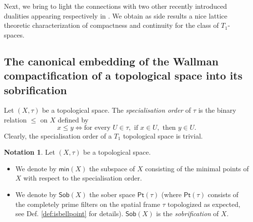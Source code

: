 \documentclass{article}
\theoremstyle{plain}
\theoremstyle{definition}
\newtheorem{notation}[theorem]{Notation}
\theoremstyle{remark}
\newcommand{\bool}[1]{\mathsf{#1}}
\newcommand{\0}{\mathbbm 0}
\newcommand{\1}{\mathbbm 1}
\newcommand{\2}{\mathbbm 2}
\begin{document}
Next, we bring to light the connections with two other recently introduced dualities appearing respectively in \cite{bice2020wallmandualitysemilatticesubbases,maruyama}. We obtain as side results a nice lattice theoretic characterization of compactness and continuity for the class of $T_1$-spaces.


\subsection{The canonical embedding of the Wallman compactification of a topological space into its sobrification} \label{subsec:cornishvsisbell}
Let $(X, \tau)$ be a topological space. The \emph{specialisation order} of $\tau$ is the binary relation $\leq$ on $X$ defined by
\[
    x \leq y \iff \text{for every } U \in \tau, \text{ if } x \in U, \text{ then } y \in U.
\]
Clearly, the specialisation order of a \(T_1\) topological space is trivial. 

\begin{notation}
Let  \((X,\tau)\) be a topological space. 
\begin{itemize}
    \item \label{not:min} We denote by \(\bool{min}(X)\) the subspace of \(X\) consisting of the minimal points of $X$ with respect to the specialisation order.
    \item \label{not:sober} We denote by \(\bool{Sob}(X)\) the sober space \(\bool{Pt}(\tau)\) (where $\bool{Pt}(\tau)$ consists of the completely prime filters on the spatial frame $\tau$ topologized as expected, see Def. \ref{def:isbellpoint} for details).  \(\bool{Sob}(X)\) is the \emph{sobrification} of \(X\).
\end{itemize}
     
\end{notation}
\end{document}

